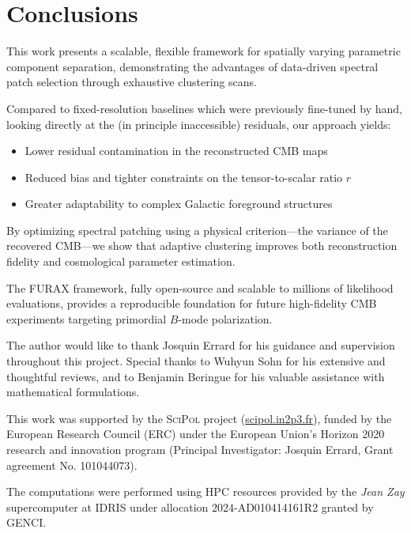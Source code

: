 \documentclass[%
 reprint,
bibnotes,
 amsmath,amssymb,
 aps,
floatfix, 
]{revtex4-2}
\begin{document}
\section{Conclusions}
\label{sec:conclusion}

This work presents a scalable, flexible framework for spatially varying parametric component separation, demonstrating the advantages of data-driven spectral patch selection through exhaustive clustering scans.

Compared to fixed-resolution baselines which were previously fine-tuned by hand, looking directly at the (in principle inaccessible) residuals, our approach yields:
\begin{itemize}
    \item Lower residual contamination in the reconstructed CMB maps
    \item Reduced bias and tighter constraints on the tensor-to-scalar ratio \( r \)
    \item Greater adaptability to complex Galactic foreground structures
\end{itemize}

By optimizing spectral patching using a physical criterion---the variance of the recovered CMB---we show that adaptive clustering improves both reconstruction fidelity and cosmological parameter estimation. 

The \textsc{FURAX} framework, fully open-source and scalable to millions of likelihood evaluations, provides a reproducible foundation for future high-fidelity CMB experiments targeting primordial \( B \)-mode polarization.

\begin{acknowledgements}

The author would like to thank Josquin Errard for his guidance and supervision throughout this project. 
Special thanks to Wuhyun Sohn for his extensive and thoughtful reviews, and to Benjamin Beringue for his valuable assistance with mathematical formulations.

This work was supported by the \textsc{SciPol} project (\href{https://scipol.in2p3.fr}{scipol.in2p3.fr}), funded by the European Research Council (ERC) under the European Union’s Horizon 2020 research and innovation program (Principal Investigator: Josquin Errard, Grant agreement No. 101044073).

The computations were performed using HPC resources provided by the \textit{Jean Zay} supercomputer at IDRIS under allocation 2024-AD010414161R2 granted by GENCI.


\end{acknowledgements}





\end{document}
